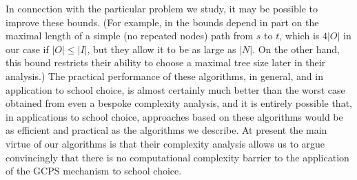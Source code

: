 \documentclass[12pt]{article}
\theoremstyle{definition}
\begin{document}
In connection with the particular problem we study, it may be possible to improve these bounds.  (For example, in \cite{GoTa88} the bounds depend in part on the maximal length of a simple (no repeated nodes) path from $s$ to $t$, which is $4|O|$ in our case if $|O| \le |I|$, but they allow it to be as large as $|N|$.  On the other hand, this bound restricts their ability to choose a maximal tree size later in their analysis.)  The practical performance of these algorithms, in general, and in application to school choice, is almost certainly much better than the worst case obtained from even a bespoke complexity analysis, and it is entirely possible that, in applications to school choice, approaches based on these algorithms would be as efficient and practical as the algorithms we describe.  At present the main virtue of our algorithms is that their complexity analysis allows us to argue convincingly that there is no computational complexity barrier to the application of the GCPS mechanism to school choice.
\end{document}

